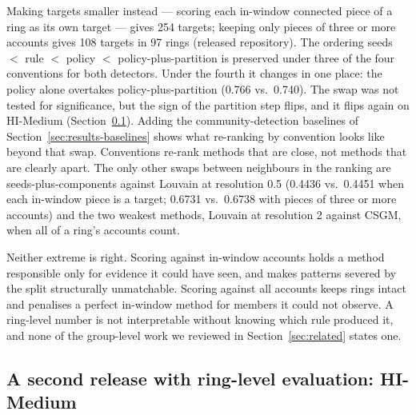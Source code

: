 Making targets smaller instead --- scoring each in-window connected piece of a ring as its own
target --- gives 254 targets; keeping only pieces of three or more accounts gives 108 targets
in 97 rings (released repository). The ordering
seeds $<$ rule $<$ policy $<$ policy-plus-partition is preserved under three of the four
conventions for both detectors. Under the fourth it changes in one place: the policy alone
overtakes policy-plus-partition (0.766 vs.\ 0.740). The swap was not tested for significance,
but the sign of the partition step flips, and it flips again on HI-Medium
(Section~\ref{sec:findings-hm}).
Adding the community-detection baselines of Section~\ref{sec:results-baselines} shows what
re-ranking by convention looks like beyond that swap. Conventions re-rank methods that are
close, not methods that are clearly apart. The only other swaps between neighbours in the
ranking are seeds-plus-components against Louvain at resolution 0.5 (0.4436 vs.\ 0.4451 when
each in-window piece is a target; 0.6731 vs.\ 0.6738 with pieces of three or more accounts)
and the two weakest methods, Louvain at resolution 2 against CSGM, when all of a ring's
accounts count.

Neither extreme is right. Scoring against in-window accounts holds a method responsible only
for evidence it could have seen, and makes patterns severed by the split structurally
unmatchable. Scoring against all accounts keeps rings intact and penalises a perfect in-window
method for members it could not observe. A ring-level number is not interpretable without
knowing which rule produced it, and none of the group-level work we reviewed in
Section~\ref{sec:related} states one.

\subsection{A second release with ring-level evaluation: HI-Medium}
\label{sec:findings-hm}

